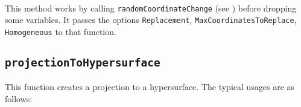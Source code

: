 \documentclass[11pt]{amsart}
\theoremstyle{definition}
\begin{document}
~~

\begin{comment}~~
  
  {{\small\color{blue}
\begin{verbatim}

i1 : R = ZZ/5[x, y, z, w];

i2 : I = ideal(x, y^2, w^3 + x^2);

i3 : genericProjection(2, R/I)	

                            ZZ                          ZZ
                            --[z, w]                    --[z, w]                        
                R           5                           5
o3 = (map(----------------,--------,{2y - w, - y - z}), --------)                       
             2   3    2        4                            4
        (x, y , w  + x )      z                            z

o3 : Sequence
\end{verbatim}}
    }}
\end{comment}


This method works by calling {\tt randomCoordinateChange} (see ) before dropping some variables.  It passes the options {\tt Replacement}, {\tt MaxCoordinatesToReplace}, {\tt Homogeneous} to that function.

\begin{comment}~~
  
  ~~
  
  {{\small\color{blue}
\begin{verbatim}
		
i2 : R = ZZ/5[x, y, z, w];

i3 : I = ideal(x, y^2, w^3 + x^2);

o3 : Ideal of R

i4 :genericProjection(2, I, Replacement => Binomial)

            ZZ                                   4
o4 = (map(R,--[z, w],{x + 2z, - 2y + w}), ideal w )                                     
            5

o4 : Sequence
\end{verbatim}}
    }}
\end{comment}

\subsection{\tt projectionToHypersurface} This function creates a projection to a hypersurface. The typical usages are as follows: 
\end{document}
